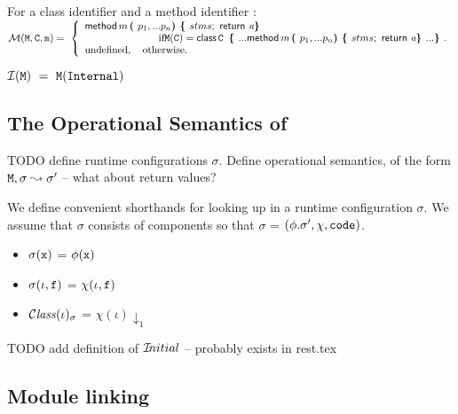   
 \begin{definition}[Lookup]For a class identifier   and a method identifier  : $ ~ $ \\

\noindent
$
{\mathcal M}({\mbox{\tt{M}}}{},{\mbox{\tt{{\mbox{\tt{C}}}}}}, {\mbox{\tt{m}}})      =  \ \left\{  
\begin{array}{l}
                          {\bf{\sf {method}}}\, m\, \mbox{\tt{\bf{( }}} p_1, ... p_n \mbox{\tt{\bf{) }}} \mbox{\tt{\bf{\{ }}} stms \mbox{{{\bf{\sf {;}}}}\ }\, {\bf{\sf {return}}}\ {{\mbox{\tt{{\it a}}}}} \mbox{\tt{\bf{\} }}}\\
\hspace{1in} \mbox{if}  {\mbox{\tt{M}}}({\mbox{\tt{C}}}) =   
{\bf{\sf {class}}}\, {\mbox{\tt{C}}}\, \  \mbox{\tt{\bf{\{ }}} ...   {\bf{\sf {method}}}\, m\, \mbox{\tt{\bf{( }}} p_1, ... p_n \mbox{\tt{\bf{) }}} \mbox{\tt{\bf{\{ }}} stms \mbox{{{\bf{\sf {;}}}}\ }\, {\bf{\sf {return}}}\ {{\mbox{\tt{{\it a}}}}} \mbox{\tt{\bf{\} }}}  ... \mbox{\tt{\bf{\} }}}.  
\\
\mbox{undefined},  \ \ \ \mbox{otherwise.}
\end{array}
                    \right.$
 
${\mathcal{ I}} ( {{\mbox{\tt{M}}}} ) \    =  \     {\mbox{\tt{M}}}({\mbox{\tt{Internal}}} )$
  \end{definition}

\subsection{The Operational Semantics of \LangOO}
\label{formal:semantics}

TODO define runtime configurations $\sigma$.
Define operational semantics, of the form ${\mbox{\tt{M}}}, \sigma \leadsto \sigma'$ -- what about return values?

\begin{definition}
We define convenient shorthands for looking up in a runtime configuration $\sigma$. We assume that
$\sigma$ consists of components so that $\sigma$ = $(\phi.\sigma', \chi, {\mbox{\tt{code}}} )$.
\begin{itemize}
\item 
$\sigma({\mbox{\tt{x}}})$ = $\phi({\mbox{\tt{x}}})$ 
\item
$\sigma(\iota, {\mbox{\tt{f}}})$ = $\chi(\iota,{\mbox{\tt{f}}})$ 
\item
${\mathcal C}{\mathit{lass}}(\iota)_{\sigma} $ = $\chi(\iota)\downarrow_1$
\end{itemize}

\end{definition}

TODO add definition of  ${{\mathcal I}\!nitial}$ -- probably exists in rest.tex

\subsection{Module linking}

